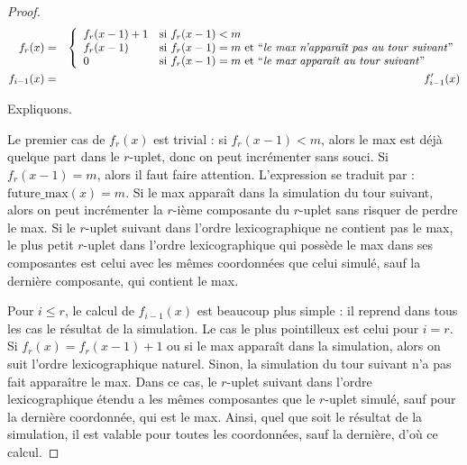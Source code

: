 \documentclass{report}
\begin{document}
\begin{proof}
			\begin{eqnarray}
				f_{r}(x) & = & \casedist{
									f_{r}(x-1) + 1 & \text{si $f_{r}(x-1) < m$} \\
									f_{r}(x-1) & \text{si $f_{r}(x-1) = m$ et \textquoted{\emph{le max n'apparaît pas au tour suivant}}}\\
									0 & \text{si $f_{r}(x-1) = m$ et \textquoted{\emph{le max apparaît au tour suivant}}}
									}\\
				f_{i-1}(x) & = & f'_{i-1}(x)
			\end{eqnarray}
			
			Expliquons. 
			
			Le premier cas de $f_{r}(x)$ est trivial : si $f_{r}(x-1)<m$, alors le max est déjà quelque part dans le $r$-uplet, donc on peut incrémenter sans souci. Si $f_{r}(x-1) = m$, alors il faut faire attention. L'expression  se traduit par : $\text{future\_max}(x) = m$. Si le max apparaît dans la simulation du tour suivant, alors on peut incrémenter la $r$-ième composante du $r$-uplet sans risquer de perdre le max. Si le $r$-uplet suivant dans l'ordre lexicographique ne contient pas le max, le plus petit $r$-uplet dans l'ordre lexicographique qui possède le max dans ses composantes est celui avec les mêmes coordonnées que celui simulé, sauf la dernière composante, qui contient le max.
			
			Pour $i\leqslant r$, le calcul de $f_{i-1}(x)$ est beaucoup plus simple : il reprend dans tous les cas le résultat de la simulation. Le cas le plus pointilleux est celui pour $i=r$. Si $f_{r}(x) = f_{r}(x-1) + 1$ ou si le max apparaît dans la simulation, alors on suit l'ordre lexicographique naturel. Sinon, la simulation du tour suivant n'a pas fait apparaître le max. Dans ce cas, le $r$-uplet suivant dans l'ordre lexicographique étendu a les mêmes composantes que le $r$-uplet simulé, sauf pour la dernière coordonnée, qui est le max. Ainsi, quel que soit le résultat de la simulation, il est valable pour toutes les coordonnées, sauf la dernière, d'où ce calcul.
			

\end{proof}
\end{document}
